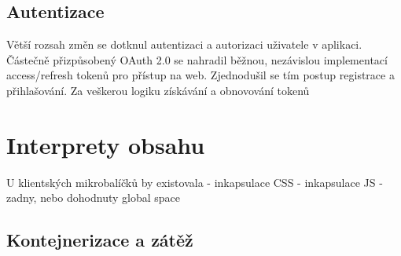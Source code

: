 \subsection{Autentizace}\label{sec:client-auth}

Větší rozsah změn se dotknul autentizaci a autorizaci uživatele v aplikaci.
Částečně přizpůsobený OAuth 2.0 se nahradil běžnou, nezávislou implementací access/refresh tokenů pro přístup na web.
Zjednodušil se tím postup registrace a přihlašování.
Za veškerou logiku získávání a obnovování tokenů




\section{Interprety obsahu}\label{sec:client-interpret}




U klientských mikrobalíčků by existovala
- inkapsulace CSS
- inkapsulace JS - zadny, nebo dohodnuty global space





\subsection{Kontejnerizace a zátěž}\label{sec:client-container}

